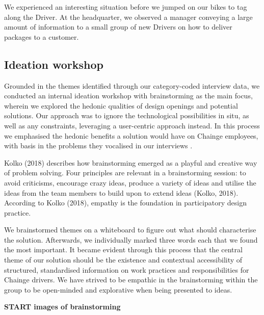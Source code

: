 We experienced an interesting situation before we jumped on our bikes to
tag along the Driver. At the headquarter, we observed a manager
conveying a large amount of information to a small group of new Drivers
on how to deliver packages to a customer.

\hypertarget{sec:ideation_workshop}{%
\subsection{Ideation workshop}\label{sec:ideation_workshop}}

Grounded in the themes identified through our category-coded interview
data, we conducted an internal ideation workshop with brainstorming as
the main focus, wherein we explored the hedonic qualities of design
openings and potential solutions. Our approach was to ignore the
technological possibilities in situ, as well as any constraints,
leveraging a user-centric approach instead. In this process we
emphasised the hedonic benefits a solution would have on Chainge
employees, with basis in the problems they vocalised in our interviews .

Kolko (2018) describes how brainstorming emerged as a playful and
creative way of problem solving. Four principles are relevant in a
brainstorming session: to avoid criticisms, encourage crazy ideas,
produce a variety of ideas and utilise the ideas from the team members
to build upon to extend ideas (Kolko, 2018). According to Kolko (2018),
empathy is the foundation in participatory design practice.

We brainstormed themes on a whiteboard to figure out what should
characterise the solution. Afterwards, we individually marked three
words each that we found the most important. It became evident through
this process that the central theme of our solution should be the
existence and contextual accessibility of structured, standardised
information on work practices and responsibilities for Chainge drivers.
We have strived to be empathic in the brainstorming within the group to
be open-minded and explorative when being presented to ideas.

\textbf{START images of brainstorming}

